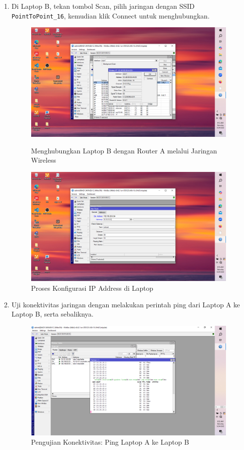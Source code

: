 \begin{enumerate}
    \item Di Laptop B, tekan tombol Scan, pilih jaringan dengan SSID \texttt{PointToPoint\_16}, kemudian klik Connect untuk menghubungkan.
    \begin{figure}[H]
        \centering
        \includegraphics[width=0.5\linewidth]{P3/img/gambar3.png}
        \caption{Menghubungkan Laptop B dengan Router A melalui Jaringan Wireless}
        \label{fig:hubungkan-laptop}
        \includegraphics[width=0.5\linewidth]{P3/img/gambar5.png}
        \caption{Proses Konfigurasi IP Address di Laptop}
        \label{fig:ip-laptop}
    \end{figure}

    \item Uji konektivitas jaringan dengan melakukan perintah ping dari Laptop A ke Laptop B, serta sebaliknya.
    \begin{figure}[H]
        \centering
        \includegraphics[width=0.5\linewidth]{P3/img/ping1.png}
        \caption{Pengujian Konektivitas: Ping Laptop A ke Laptop B}
        \label{fig:ping-ptp}
    \end{figure}
\end{enumerate}

